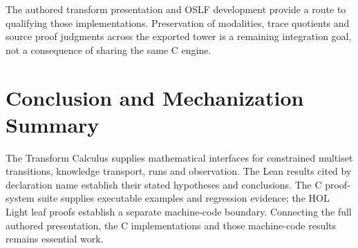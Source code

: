 \documentclass[11pt,a4paper]{article}
\theoremstyle{definition}
\begin{document}
The authored transform presentation and OSLF development provide a route to
qualifying those implementations. Preservation of modalities, trace quotients
and source proof judgments across the exported tower is a remaining integration
goal, not a consequence of sharing the same C engine.

\section{Conclusion and Mechanization Summary}
\label{sec:conclusion}

The Transform Calculus supplies mathematical interfaces for constrained
multiset transitions, knowledge transport, runs and observation. The Lean
results cited by declaration name establish their stated hypotheses and
conclusions. The C proof-system suite supplies executable examples and
regression evidence; the HOL Light leaf proofs establish a separate
machine-code boundary. Connecting the full authored presentation, the C
implementations and those machine-code results remains essential work.
\end{document}
